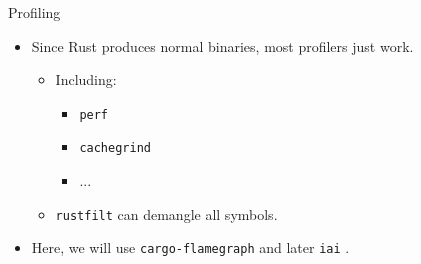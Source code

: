\documentclass[compress,aspectratio=169]{beamer}
\begin{document}
\begin{frame}{Profiling}
  \begin{itemize}
    \item Since Rust produces normal binaries, most profilers just work.
      \begin{itemize}
        \item Including:
          \begin{itemize}
            \item \texttt{perf} \cite{perfwiki}
            \item \texttt{cachegrind} \cite{valgrind}
            \item ...
          \end{itemize}
        \item \texttt{rustfilt} \cite{rustfilt} can demangle all symbols.
      \end{itemize}
      \pause
    \item Here, we will use \texttt{cargo-flamegraph} \cite{cargoflamegraph} and later \texttt{iai} \cite{iai}.
  \end{itemize}
\end{frame}
\end{document}
